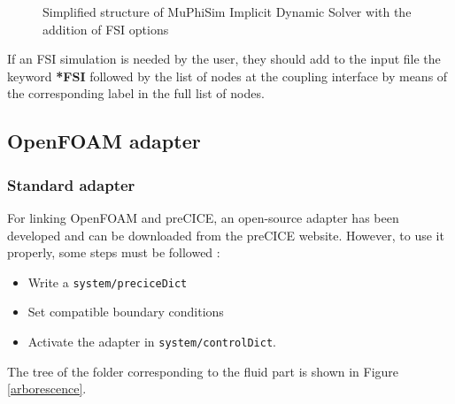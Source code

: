 \documentclass[oneside,11pt,times]{book}
\begin{document}
\begin{figure}[H]
	\caption{Simplified structure of MuPhiSim Implicit Dynamic Solver with the addition of FSI options}
	\label{fig:solverIDFSI}
\end{figure}

If an FSI simulation is needed by the user, they should add to the input file the keyword \textbf{*FSI} followed by the list of nodes at the coupling interface by means of the corresponding label in the full list of nodes.\\

\subsection{OpenFOAM adapter}
\subsubsection{Standard adapter}
For linking OpenFOAM and preCICE, an open-source adapter has been developed and can be downloaded from the preCICE website. However, to use it properly, some steps must be followed :
\begin{itemize}
    \item Write a \texttt{system/preciceDict}
    \item Set compatible boundary conditions
    \item Activate the adapter in \texttt{system/controlDict}.
\end{itemize}

The tree of the folder corresponding to the fluid part is shown in Figure \ref{arborescence}.
\end{document}
